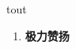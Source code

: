 
\begin{frame}
{\huge tout}
\begin{center}
\begin{enumerate}\Large
  \item \textbf{极力赞扬}
\end{enumerate}
\end{center}
\end{frame}
